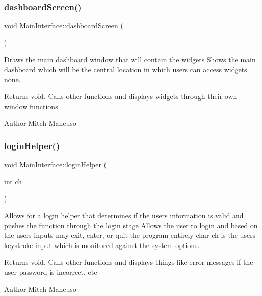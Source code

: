 \subsubsection{\texorpdfstring{dashboard\+Screen()}{dashboardScreen()}}
{\footnotesize\ttfamily void Main\+Interface\+::dashboard\+Screen (\begin{DoxyParamCaption}{ }\end{DoxyParamCaption})}



Draws the main dashboard window that will contain the widgets  Shows the main dashboard which will be the central location in which users can access widgets  none. 

\begin{DoxyReturn}{Returns}
void. Calls other functions and displays widgets through their own window functions 
\end{DoxyReturn}
\begin{DoxyAuthor}{Author}
Mitch Mancuso 
\end{DoxyAuthor}
\mbox{\label{class_main_interface_a27867852cb6204a224608e273113fcec}} 
\subsubsection{\texorpdfstring{login\+Helper()}{loginHelper()}}
{\footnotesize\ttfamily void Main\+Interface\+::login\+Helper (\begin{DoxyParamCaption}\item[{int}]{ch }\end{DoxyParamCaption})}



Allows for a login helper that determines if the user\textquotesingle{}s information is valid and pushes the function through the login stage  Allows the user to login and based on the user\textquotesingle{}s inputs may exit, enter, or quit the program entirely  char ch is the user\textquotesingle{}s keystroke input which is monitored against the system options. 

\begin{DoxyReturn}{Returns}
void. Calls other functions and displays things like error messages if the user password is incorrect, etc 
\end{DoxyReturn}
\begin{DoxyAuthor}{Author}
Mitch Mancuso 
\end{DoxyAuthor}
\mbox{\label{class_main_interface_a49a0a59ee12a2753ffe542f935e5b0fe}} 
